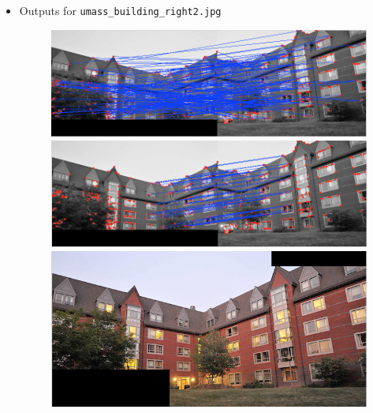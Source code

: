 \documentclass[10pt,letterpaper]{article}
\newcommand{\cmd}[1] {{\color{blue}\texttt{#1}}}
\begin{document}
\begin{itemize}
\item Outputs for \cmd{umass\_building\_right2.jpg}
\begin{figure}[h]
\centering
\includegraphics[width=0.9\linewidth]{../latex/allmatches.png} \\
\includegraphics[width=0.9\linewidth]{../latex/inliers.png} \\
\includegraphics[width=0.9\linewidth]{../latex/result.png} \\
\end{figure}
\newpage


\end{itemize}
\end{document}
